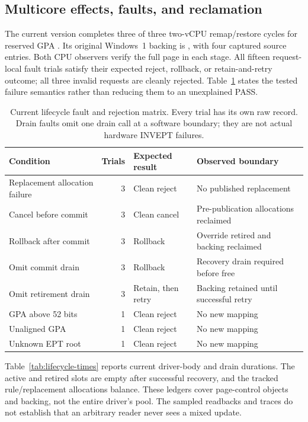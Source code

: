 \subsection{Multicore effects, faults, and reclamation}
\label{sec:lifecycle-results}
The current version completes three of three two-vCPU remap/restore cycles for
reserved GPA . Its original Windows~1 backing is
, with four captured source entries. Both CPU observers verify
the full page in each stage. All fifteen request-local fault trials satisfy
their expected reject, rollback, or retain-and-retry outcome; all three invalid
requests are cleanly rejected. Table~\ref{tab:faults} states the tested failure
semantics rather than reducing them to an unexplained PASS.

\begin{table}[tbp]
\centering\small
\caption{Current lifecycle fault and rejection matrix. Every trial has its own
raw record. Drain faults omit one drain call at a software boundary; they are
not actual hardware INVEPT failures.}
\label{tab:faults}
\begin{tabularx}{\linewidth}{@{}lrlX@{}}
\toprule
Condition & Trials & Expected result & Observed boundary \\
\midrule
Replacement allocation failure & 3 & Clean reject & No published replacement \\
Cancel before commit & 3 & Clean cancel & Pre-publication allocations reclaimed \\
Rollback after commit & 3 & Rollback & Override retired and backing reclaimed \\
Omit commit drain & 3 & Rollback & Recovery drain required before free \\
Omit retirement drain & 3 & Retain, then retry & Backing retained until successful retry \\
GPA above 52 bits & 1 & Clean reject & No new mapping \\
Unaligned GPA & 1 & Clean reject & No new mapping \\
Unknown EPT root & 1 & Clean reject & No new mapping \\
\bottomrule
\end{tabularx}
\end{table}

Table~\ref{tab:lifecycle-times} reports current driver-body and drain durations.
The active and retired slots are empty after successful recovery, and the
tracked rule/replacement allocations balance. These ledgers cover page-control
objects and backing, not the entire driver's pool. The sampled readbacks and
traces do not establish that an arbitrary reader never sees a mixed update.


